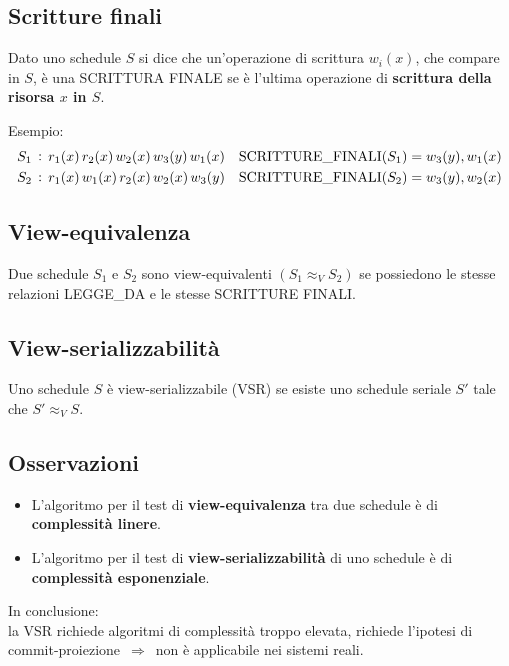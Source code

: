 \documentclass[a4paper, 10pt]{article}
\theoremstyle{definition}
\begin{document}
		\subsection*{Scritture finali}
			Dato uno schedule $ S $ si dice che un'operazione di scrittura
			$ w_i(x) $, che compare in $ S $, è una SCRITTURA FINALE se è
			l'ultima operazione di \textbf{scrittura della risorsa $ x $ in $ S $}.
			
			Esempio:
			\begin{align*}
				S_1 \, & : \, r_1(x) \, r_2(x) \, w_2(x) \, w_3(y) \, w_1(x) \quad \textup{SCRITTURE\_FINALI}(S_1) = {w_3(y), w_1 (x)} \\
				S_2 \, & : \, r_1(x) \, w_1(x) \, r_2(x) \, w_2(x) \, w_3(y) \quad \textup{SCRITTURE\_FINALI}(S_2) = {w_3(y), w_2 (x)}
			\end{align*}
			
		\subsection*{View-equivalenza}
			Due schedule $ S_1 $ e $ S_2 $ sono view-equivalenti $ (S_1 \approx_V S_2 ) $ se
			possiedono le stesse relazioni LEGGE\_DA e le stesse
			SCRITTURE FINALI.
			
		\subsection*{View-serializzabilità}
			Uno schedule $ S $ è view-serializzabile (VSR) se esiste uno
			schedule seriale $ S' $ tale che $ S' \approx_V S $.
			
		\subsection*{Osservazioni}
			\begin{itemize}
				\item L'algoritmo per il test di \textbf{view-equivalenza} tra due
				schedule è di \textbf{complessità linere}.
				\item L'algoritmo per il test di \textbf{view-serializzabilità} di uno
				schedule è di \textbf{complessità esponenziale}. 
			\end{itemize}
			In conclusione:\\
			la VSR richiede algoritmi di complessità troppo elevata, richiede l'ipotesi di commit-proiezione
			$\, \Rightarrow \, $ non è applicabile nei sistemi reali.
			
\end{document}
